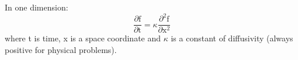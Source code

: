 In one dimension:
\[ \frac{\partial \mathrm{f}}{\partial \mathrm{t}}
= \kappa \frac{\partial ^2 \mathrm{f}}{\partial \mathrm{x} ^2 } \]
where t is time, x is a space coordinate and $ \kappa $ is a constant
of diffusivity (always positive for physical problems).